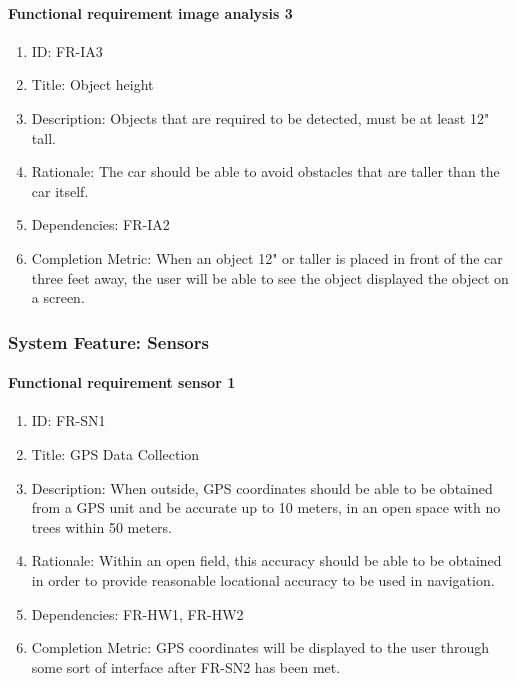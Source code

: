 \documentclass[compsoc,draftclsnofoot,onecolumn,10pt]{IEEEtran}
\begin{document}
	\paragraph{Functional requirement image analysis 3}
		\begin{enumerate}
			\item ID: FR-IA3
			\item Title: Object height
			\item Description: Objects that are required to be detected, must be at least 12" tall. 
			\item Rationale: The car should be able to avoid obstacles that are taller than the car itself. 
			\item Dependencies: FR-IA2
			\item Completion Metric: When an object 12" or taller is placed in front of the car three feet away, the user will be able to see the object displayed the object on a screen. 
		\end{enumerate}

\subsubsection{System Feature: Sensors}

	\paragraph{Functional requirement sensor 1}
    		\begin{enumerate}
    			\item ID: FR-SN1
    			\item Title: GPS Data Collection
    			\item Description: When outside, GPS coordinates should be able to be obtained from a GPS unit and be accurate up to 10 meters, in an open space with no trees within 50 meters. 
    			\item Rationale: Within an open field, this accuracy should be able to be obtained in order to provide reasonable locational accuracy to be used in navigation.
    			\item Dependencies: FR-HW1, FR-HW2
			\item Completion Metric: GPS coordinates will be displayed to the user through some sort of interface after FR-SN2 has been met. 
    		\end{enumerate}
		
\end{document}
